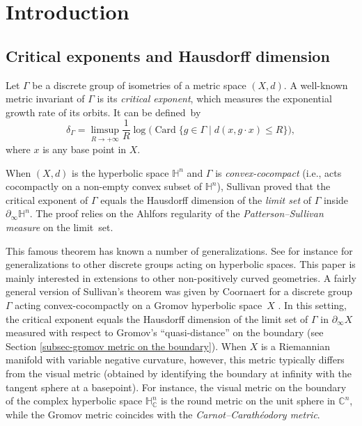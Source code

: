 \documentclass[11pt]{article}
\newcommand{\ie}{i.e.,\xspace}
\numberwithin{equation}{section}
\theoremstyle{definition}
\newcommand{\C}{\mathbb{C}}
\newcommand{\Hyp}{\mathbb{H}}
\DeclareMathOperator{\Card}{Card}
\let\G\Gamma
\begin{document}

\section{Introduction}

\subsection{Critical exponents and Hausdorff dimension}

Let $\G$ be a discrete group of isometries of a metric space $(X,d)$. A well-known metric invariant of $\G$ is its \emph{critical exponent}, which measures the exponential growth rate of its orbits. It can be defined~by
\[\delta_\Gamma = \limsup_{R\to +\infty} \frac{1}{R}\log\bigl(\Card\{g\in \G \mid d(x,g \cdot x) \leq R\}\bigr),\]
where $x$ is any base point in $X$.

When $(X,d)$ is the hyperbolic space $\Hyp^n$ and $\G$ is \emph{convex-cocompact} (\ie acts cocompactly on a non-empty convex subset of $\Hyp^n$), Sullivan \cite{sullivan1979density} proved that the critical exponent of $\G$ equals the Hausdorff dimension of the \emph{limit set} of $\G$ inside $\partial_\infty \Hyp^n$. The proof relies on the Ahlfors regularity of the \emph{Patterson--Sullivan measure} on the limit~set.

This famous theorem has known a number of generalizations. See for instance \cite{DOP,roblin2003ergodicite,Coornaert} for generalizations to other discrete groups acting on hyper\-bolic spaces. This paper is mainly interested in extensions to other non-positively curved geometries. A fairly general version of Sullivan's theorem was given by Coornaert for a discrete group $\G$ acting convex-cocompactly on a Gromov hyperbolic space~$X$ \cite[Cor.\,7.6]{Coornaert}. In this setting, the critical exponent equals the Hausdorff dimension of the limit set of $\G$ in $\partial_\infty X$ measured with respect to Gromov's ``quasi-distance'' on the boundary (see Section \ref{subsec-gromov metric on the boundary}). When $X$ is a Riemannian manifold with variable negative curvature, however, this metric typically differs from the visual metric (obtained by identifying the boundary at infinity with the tangent sphere at a basepoint). For instance, the visual metric on the boundary of the complex hyper\-bolic space $\Hyp^n_\C$ is the round metric on the unit sphere in $\C^n$, while the Gromov metric coincides with the \emph{Carnot--Carathéodory metric}.
\end{document}
